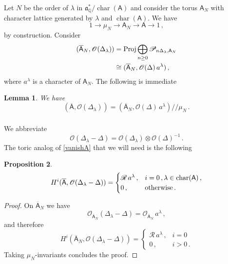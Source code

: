 \documentclass[14pt]{extarticle}
\newcommand{\Q}{\mathbb{Q}}
\newcommand{\bA}{\mathsf{A}}
\newcommand{\cR}{\mathscr{R}}
\newcommand{\cP}{\mathscr{P}}
\newcommand{\bbA}{\overline{\bA}}
\newcommand{\cO}{\mathscr{O}}
\newcommand{\fa}{\mathfrak{a}}
\DeclareMathOperator{\cha}{char}
\DeclareMathOperator{\Proj}{Proj}
\newtheorem{Lemma}{Lemma}[section]
\newtheorem{Proposition}[Lemma]{Proposition}
\theoremstyle{definition}
\begin{document}
  \subsubsection{}\label{s_orderN} 
  Let $N$ be the order of $\lambda$ in $\fa^*_\Q/\cha(\bA)$ and consider the
  torus $\bA_N$ with character lattice generated by $\lambda$ and
  $\cha(\bA)$. We have
  \begin{equation}
  1 \to \mu_N \to \bA_N \to \bA \to 1 \,, 
\label{bAN}
\end{equation}%
  by construction. Consider
  \begin{align}
  (\bbA_N, \cO(\Delta_\lambda)) &= \Proj \bigoplus_{n\ge 0} \cP_{n
                                  \Delta_\lambda,\bA_N}  \notag \\ 
                                  & \cong  (\bbA_N, \cO(\Delta)\,
                                    a^\lambda)\,, 
\label{Proj2}
\end{align}
%
where $a^\lambda$ is a character of $\bA_N$.  The following is
immediate

\begin{Lemma}
  We have
  \begin{equation}
    \label{eq:5}
      (\bbA, \cO(\Delta_\lambda)) =  (\bbA_N, \cO(\Delta) \, a^\lambda)
      \Big/ \!\!\!\! \Big/\mu_N \,. 
    \end{equation}
\end{Lemma}



  \subsubsection{}
  We abbreviate
  $$
  \cO(\Delta_\lambda - \Delta) = \cO(\Delta_\lambda) \otimes
  \cO(\Delta)^{-1} \,.
  $$
  The toric analog of \eqref{vanishA} that we will need is the
  following 
  \begin{Proposition}
    \begin{equation}
    H^i( \bbA,  \cO(\Delta_\lambda - \Delta)) = 
    \begin{cases}
      \cR \, a^\lambda\,, & i=0\,,   \lambda \in \cha(\bA) \,, \\
      0 \,, & \textup{otherwise} \,. 
    \end{cases}
\label{torvan}
\end{equation} %
\end{Proposition}


\begin{proof}
  On $\bbA_N$ we have
  $$
  \cO_{\bbA_N}(\Delta_\lambda-\Delta) = \cO_{\bbA_N} \, a^\lambda \,, 
  $$
  and therefore
  \begin{equation}
    H^i( \bbA_N,  \cO(\Delta_\lambda - \Delta)) = 
    \begin{cases}
      \cR \, a^\lambda\,, & i=0 \\
      0 \,, & i>0 \,. 
    \end{cases}
\label{torvan2}
\end{equation} %
Taking $\mu_N$-invariants concludes the proof. 
  \end{proof}
\end{document}
